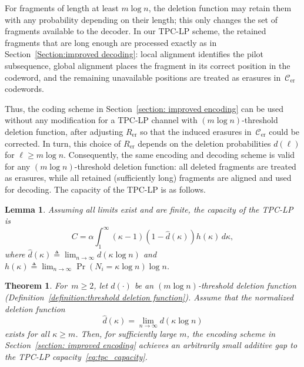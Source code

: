 \documentclass[journal,letterpaper,onecolumn,11pt]{IEEEtran}
\newcommand{\cC}{\mathcal{C}}
\newtheorem{theorem}{Theorem}
\newtheorem{lemma}{Lemma}
\begin{document}
For fragments of length at least $m\log n$, the deletion function may retain
them with any probability depending on their length; this only changes the set
of fragments available to the decoder. 
In our TPC-LP scheme, the retained fragments that are long enough are processed exactly as in Section~\ref{Section:improved decoding}:
local alignment identifies the pilot subsequence, global alignment places the fragment in its correct position in the codeword, and the remaining unavailable positions are treated as erasures in~$\cC_\text{er}$ codewords.

Thus, the coding scheme in Section~\ref{section: improved encoding} can be used without any modification for a TPC-LP channel with $(m\log n)$-threshold deletion function, after adjusting $R_\text{er}$ so that the induced erasures in~$\cC_\text{er}$ could be corrected.
In turn, this choice of $R_\text{er}$ depends on the deletion probabilities $d(\ell)$ for $\ell\ge m\log n$.
Consequently, the same encoding and decoding scheme is valid for any $(m\log n)$-threshold
deletion function: all deleted fragments are treated as
erasures, while all retained (sufficiently long) fragments are aligned and used
for decoding.
The capacity of the TPC-LP is as follows.

\begin{lemma}\label{lemma:capacity of tplcp}\cite[Corollary 2]{ravi2024recovering}
Assuming all limits exist and are finite, the capacity of the TPC-LP is 
\begin{equation} \label{eq:tpc_capacity}
    C = \alpha \int_{1}^{\infty} (\kappa - 1) \left( 1 - \hat{d}(\kappa) \right) h(\kappa) \, d\kappa, \tag{13}
\end{equation}
where $\hat{d}(\kappa) \triangleq \lim_{n \to \infty} d(\kappa \log n)$ and $h(\kappa) \triangleq \lim_{n \to \infty} \Pr(N_i = \kappa \log n) \log n$.
\end{lemma}
\begin{theorem}\label{theorem:arbitrarily small gap generalized tpclp}
For~$m\ge 2$, let $d(\cdot)$ be an $(m\log n)$-threshold deletion function (Definition~\ref{definition:threshold deletion function}).
Assume that the normalized deletion function
\[
    \hat d(\kappa)= \lim_{n\to\infty} d(\kappa\log n)
\]
exists for all $\kappa\ge m$.
Then, for sufficiently large $m$, the encoding scheme in
Section~\ref{section: improved encoding} achieves an arbitrarily small
additive gap to the TPC-LP capacity~\eqref{eq:tpc_capacity}.
\end{theorem}
\end{document}
